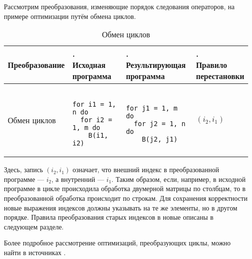 Рассмотрим преобразования, изменяющие порядок следования операторов, на примере оптимизации путём обмена циклов.

\begin{table}[htbp]
    \begin{tabular}{|p{4cm}|p{4cm}|p{4cm}|p{3cm}|}
        \hline
        Преобразование & \parbox{4cm}{.\\Исходная \\программа\\} & \parbox{4cm}{.\\Результирующая \\программа\\} & \parbox{3cm}{.\\Правило \\перестановки\\} \\
        \hline
        Обмен циклов & 
        \footnotesize{
            \begin{minipage}{4cm}
                \begin{verbatim}

for i1 = 1, n do
  for i2 = 1, m do
    B(i1, i2)
                \end{verbatim}
            \end{minipage}
        } & 
        \footnotesize{
            \begin{minipage}{4cm}
                \begin{verbatim}

for j1 = 1, m do
  for j2 = 1, n do
    B(j2, j1)
                \end{verbatim}
            \end{minipage}
        } &
        $(i_2, i_1)$\\
        \hline
    \end{tabular}
    \label{tab:loop-transformation}
    \caption{Обмен циклов}
\end{table}

\label{ss:loop-interchange}
Здесь, запись $(i_2, i_1)$ означает, что внешний индекс в преобразованной программе --- $i_2$, а внутренний --- $i_1$. Таким образом, если, например, в исходной программе в цикле происходила обработка двумерной матрицы по столбцам, то в преобразованной обработка происходит по строкам. Для сохранения корректности новые выражения индексов должны указывать на те же элементы, но в другом порядке. Правила преобразования старых индексов в новые описаны в следующем разделе.

Более подробное рассмотрение оптимизаций, преобразующих циклы, можно найти в источниках \cite{ZuckPFGH02,Bacon}.


